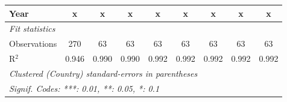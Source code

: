 \begin{table}[htbp]
\begin{tabular}{lcccccccc}
      Year                                                      & x              & x       & x       & x           & x           & x           & x           & x\\  
      \midrule \emph{Fit statistics}\\
      Observations                                              & 270            & 63      & 63      & 63          & 63          & 63          & 63          & 63\\  
      R$^2$                                                     & 0.946          & 0.990   & 0.990   & 0.992       & 0.992       & 0.992       & 0.992       & 0.992\\  
      \midrule
      \multicolumn{9}{l}{\emph{Clustered (Country) standard-errors in parentheses}}\\
      \multicolumn{9}{l}{\emph{Signif. Codes: ***: 0.01, **: 0.05, *: 0.1}}\\
   \end{tabular}
\end{table}


